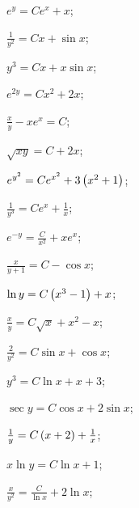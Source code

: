 	\label{firstorder:to_linear}
	\begin{enumsols}

		\item \( e^{y} = Ce^{x} + x \); \sfill %
		\item \( \frac{1}{y^2} = Cx + \sin{x} \); \sfill %
		\item \( y^3 = Cx + x \sin{x} \); \sfill %
		\item \( e^{2y} = Cx^2 + 2x \); \sfill %
		\item \( \frac{x}{y} - xe^{x} = C \); \sfill %
		\item \( \sqrt{xy} = C + 2x \); \sfill %
		\item \( e^{y^2} = C e^{x^2} + 3 \left( x^2 + 1 \right) \); \sfill %
		\item \( \frac{1}{y^3} = Ce^{x} + \frac{1}{x} \); \sfill %
		\item \( e^{-y} = \frac{C}{x^2} + xe^{x} \); \sfill %
		\item \( \frac{x}{y + 1} = C - \cos{x} \); \sfill %
		\item \( \ln{y} = C \left( x^3 - 1 \right) + x \); \sfill %
		\item \( \frac{x}{y} = C \sqrt{x} + x^2 - x \); \sfill %
		\item \( \frac{2}{y^2} = C \sin{x} + \cos{x} \); \sfill %
		\item \( y^3 = C \ln{x} + x + 3 \); \sfill %
		\item \( \sec{y} = C \cos{x} + 2 \sin{x} \); \sfill %
		\item \( \frac{1}{y} = C \left( x + 2 \right) + \frac{1}{x} \); \sfill %
		\item \( x\ln{y} = C \ln{x} + 1 \); \sfill %
		\item \( \frac{x}{y^2} = \frac{C}{\ln{x}} + 2 \ln{x} \); \sfill %

\end{enumsols}
